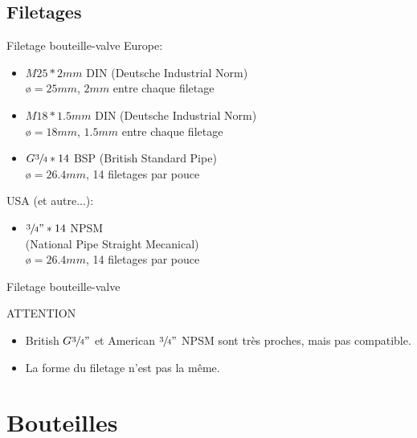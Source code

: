 \documentclass[aspectratio=1610,english,12pt]{beamer}
\begin{document}
\subsection{Filetages}

\begin{frame}{Filetage bouteille-valve}
	Europe:
	\begin{itemize}
		\item $M25*2mm$ DIN (Deutsche Industrial Norm)\\
			{\o}$=25mm$, $2mm$ entre chaque filetage\\
			\hfill
		\item $M18*1.5mm$ DIN (Deutsche Industrial Norm)\\
			{\o}$=18mm$, $1.5mm$ entre chaque filetage\\
			\hfill
		\item $G \sfrac{3}{4}*14$ BSP (British Standard Pipe)\\
			{\o}$=26.4mm$, 14 filetages par pouce\\
			\hfill
	\end{itemize}
	USA (et autre...):
	\begin{itemize}
		\item $\sfrac{3}{4}"*14$ NPSM\\
			(National Pipe Straight Mecanical)\\
			{\o}$=26.4mm$, 14 filetages par pouce\\
			\hfill
	\end{itemize}
\end{frame}

\begin{frame}{Filetage bouteille-valve}
	\begin{block}{ATTENTION}
		\begin{itemize}
			\item British $G \sfrac{3}{4}"$ et American $\sfrac{3}{4}"$ NPSM sont très proches, mais 	pas compatible.
			\item	La forme du filetage n'est pas la même.
		\end{itemize}
	\end{block}
\end{frame}

\section{Bouteilles}
\end{document}
